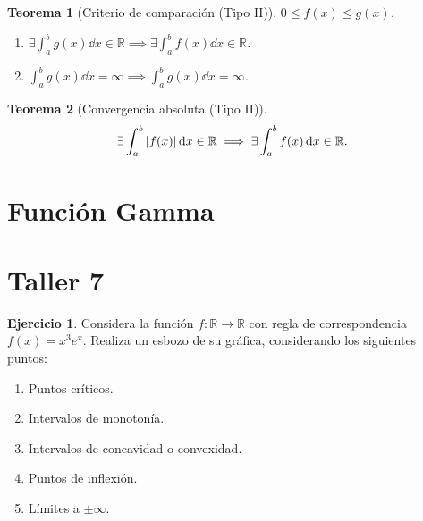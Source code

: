 \documentclass{article}
\theoremstyle{definicion}
\theoremstyle{definition}             %
\theoremstyle{definition}             %
\theoremstyle{definition}
\theoremstyle{definition}
\theoremstyle{observacion}
\theoremstyle{definition}
\theoremstyle{plain}
\newtheorem{theorem}{Teorema}
\theoremstyle{definition}
\theoremstyle{afirmacion}
\theoremstyle{definition}
\newtheorem{eje}{Ejercicio}
\begin{document}
    \begin{theorem}[Criterio de comparación (Tipo II)]
        \(0 \leq f(x) \leq g(x)\).

        \begin{enumerate}
            \item \(\exists \int_{a}^{b}g(x)\dd{x}\in\mathbb{R} \implies \exists \int_{a}^{b}f(x)\dd{x}\in\mathbb{R}\).
            \item \(\int_{a}^{b}g(x)\dd{x} = \infty \implies \int_{a}^{b}g(x)\dd{x} = \infty\).
        \end{enumerate}
    \end{theorem}

    \begin{theorem}[Convergencia absoluta (Tipo II)]
        \vphantom{flfjdaslkjfaskdjf}
        \begin{equation*}
            \exists \int_{a}^{b}\abs{f(x)}\dd{x}\in\mathbb{R} \implies \exists \int_{a}^{b}f(x)\dd{x}\in\mathbb{R}.
        \end{equation*}
    \end{theorem}

    \section{Función Gamma}

    \section{Taller 7}

    \begin{eje}
        Considera la función \(f \colon \mathbb{R} \to \mathbb{R}\) con regla de correspondencia \(f(x) = x^{3}e^{x}\). Realiza un esbozo de su gráfica, considerando los siguientes puntos:
        \begin{enumerate}[label = \alph*)]
            \item Puntos críticos.
            \item Intervalos de monotonía.
            \item Intervalos de concavidad o convexidad.
            \item Puntos de inflexión.
            \item Límites a \(\pm \infty\).
        \end{enumerate}
    \end{eje}
\end{document}
